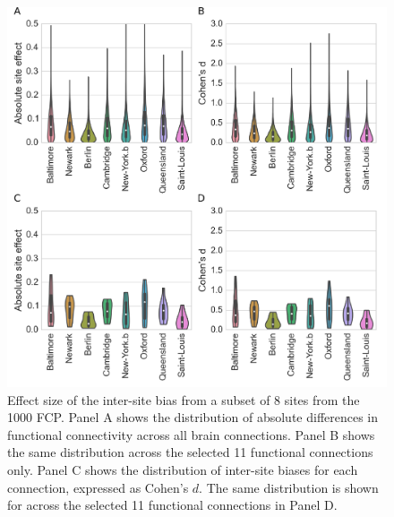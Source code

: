 \documentclass[authoryear]{elsarticle}
\begin{document}

\begin{figure}[htbp]
\begin{center}
\includegraphics[width=0.8\linewidth]{../figures/effect_distribution.png}
\end{center}
\caption[inter site variability]{
Effect size of the inter-site bias from a subset of 8 sites from the 1000 FCP. Panel A shows the distribution of absolute differences in functional connectivity across all brain connections. Panel B shows the same distribution across the selected 11 functional connections only. Panel C shows the distribution of inter-site biases for each connection, expressed as Cohen's $d$. The same distribution is shown for across the selected 11 functional connections in Panel D.
}
\label{fig_site_variability}
\end{figure}
\end{document}
